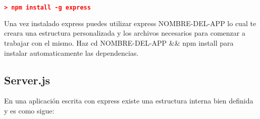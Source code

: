 \begin{lstlisting}[language=JSON] 
    > npm install -g express
\end{lstlisting}

Una vez instalado express puedes utilizar express NOMBRE-DEL-APP lo cual te creara una estructura personalizada y los archivos necesarios para comenzar a trabajar con el mismo. Haz cd NOMBRE-DEL-APP && npm install para instalar automaticamente las dependencias.

\subsection{Server.js}

En una aplicación escrita con express existe una estructura interna bien definida y es como sigue:


